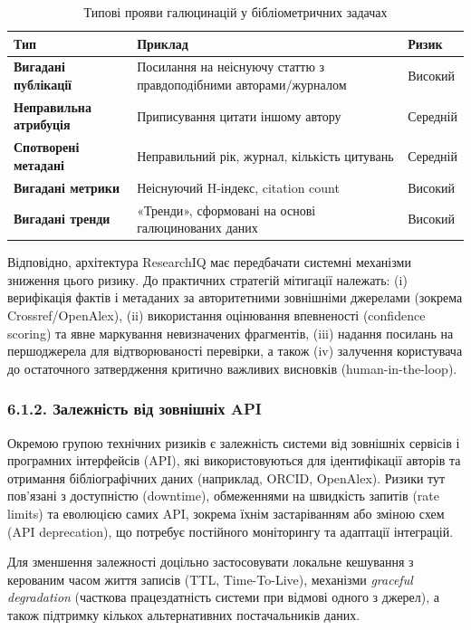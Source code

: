 \begin{longtable}{@{}p{}p{}p{}@{}}
\caption{Типові прояви галюцинацій у бібліометричних задачах}\label{tab:hallucinations-biblio}\\
\toprule
\textbf{Тип} & \textbf{Приклад} & \textbf{Ризик} \\
\midrule
\textbf{Вигадані публікації} & Посилання на неіснуючу статтю з правдоподібними авторами/журналом & Високий \\
\textbf{Неправильна атрибуція} & Приписування цитати іншому автору & Середній \\
\textbf{Спотворені метадані} & Неправильний рік, журнал, кількість цитувань & Середній \\
\textbf{Вигадані метрики} & Неіснуючий H-індекс, citation count & Високий \\
\textbf{Вигадані тренди} & «Тренди», сформовані на основі галюцинованих даних & Високий \\
\bottomrule
\end{longtable}

Відповідно, архітектура ResearchIQ має передбачати системні механізми зниження цього ризику. До практичних стратегій мітигації належать: (i) верифікація фактів і метаданих за авторитетними зовнішніми джерелами (зокрема Crossref/OpenAlex), (ii) використання оцінювання впевненості (confidence scoring) та явне маркування невизначених фрагментів, (iii) надання посилань на першоджерела для відтворюваності перевірки, а також (iv) залучення користувача до остаточного затвердження критично важливих висновків (human-in-the-loop).

\subsubsection*{6.1.2. Залежність від зовнішніх API}

Окремою групою технічних ризиків є залежність системи від зовнішніх сервісів і програмних інтерфейсів (API), які використовуються для ідентифікації авторів та отримання бібліографічних даних (наприклад, ORCID, OpenAlex). Ризики тут пов'язані з доступністю (downtime), обмеженнями на швидкість запитів (rate limits) та еволюцією самих API, зокрема їхнім застаріванням або зміною схем (API deprecation), що потребує постійного моніторингу та адаптації інтеграцій.

Для зменшення залежності доцільно застосовувати локальне кешування з керованим часом життя записів (TTL, Time-To-Live), механізми \emph{graceful degradation} (часткова працездатність системи при відмові одного з джерел), а також підтримку кількох альтернативних постачальників даних.

